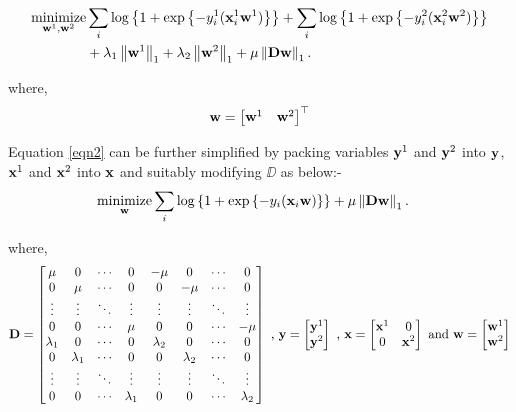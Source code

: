 \documentclass[conference,10pt,draftclsnofoot,onecolumn]{IEEEtran}
\begin{document}
\begin{align}
\label{eqn2}
\mathop{\textrm{minimize}}_{\ww^{1}, \ww^{2}} & \sum_i \mylog{1 + \myexp{-y^{1}_i(\xx^{1}_i\ww^{1})}} + \sum_i \mylog{1 + \myexp{-y^{2}_i(\xx^{2}_i\ww^{2})}} \\
                                              & + \lambda_{1}\nrmo{\ww^{1}} + \lambda_{2}\nrmo{\ww^{2}} + \mu\nrmo{\DD\ww} \notag.
\end{align}

where,
\[
\mathbf{w} = \begin{bmatrix} \mathbf{w}^{1} & \mathbf{w}^{2}\end{bmatrix}^\top
\]


Equation \eqref{eqn2} can be further simplified by packing variables $\mathbf{y}^1$ and $\mathbf{y}^2$ into $\mathbf{y}$, $\mathbf{x}^1$ and $\mathbf{x}^2$ into $\mathbf{x}$ and suitably modifying $\DD$ as below:-
\begin{align}
\label{eqn3}
\mathop{\textrm{minimize}}_{\ww} & \sum_i \mylog{1 + \myexp{-y_i(\xx_i\ww)}} + \mu\nrmo{\DD\ww}.
\end{align}

where,
\[
    \mathbf{D} = \begin{bmatrix}   \mu & 0 & \cdots & 0 & -\mu & 0 & \cdots & 0\\
    0 & \mu & \cdots & 0 & 0 & -\mu & \cdots & 0\\
    \vdots & \vdots & \ddots & \vdots & \vdots & \vdots & \ddots & \vdots\\
    0 & 0 & \cdots & \mu & 0 & 0 & \cdots & -\mu \\
    \lambda_1 & 0 & \cdots & 0 & \lambda_2 & 0 & \cdots & 0\\
    0 & \lambda_1 & \cdots & 0 & 0 & \lambda_2 & \cdots & 0\\
    \vdots & \vdots & \ddots & \vdots & \vdots & \vdots & \ddots & \vdots\\
    0 & 0 & \cdots & \lambda_1 & 0 & 0 & \cdots & \lambda_2
    \end{bmatrix}\\
    \textrm{ ,  }\\
    \mathbf{y} = \begin{bmatrix} \mathbf{y}^{1} \\ \mathbf{y}^{2}\end{bmatrix}\\
    \textrm{ ,  }\\
    \mathbf{x} = \begin{bmatrix} \mathbf{x}^{1} & 0 \\ 0 & \mathbf{x}^{2}\end{bmatrix}\\
    \textrm{ and  }\\
    \mathbf{w} = \begin{bmatrix} \mathbf{w}^{1} \\ \mathbf{w}^{2}\end{bmatrix}
\]
\end{document}
